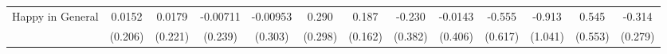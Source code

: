 {\begin{tabular}{l*{12}{c}}
\addlinespace
Happy in General&      0.0152         &      0.0179         &    -0.00711         &    -0.00953         &       0.290         &       0.187         &      -0.230         &     -0.0143         &      -0.555         &      -0.913         &       0.545         &      -0.314         \\
            &     (0.206)         &     (0.221)         &     (0.239)         &     (0.303)         &     (0.298)         &     (0.162)         &     (0.382)         &     (0.406)         &     (0.617)         &     (1.041)         &     (0.553)         &     (0.279)         \\
\bottomrule
\end{tabular}
}
